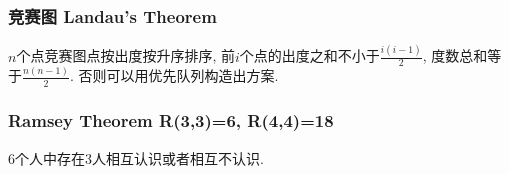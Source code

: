 \subsubsection{竞赛图 Landau's Theorem}
    $n$个点竞赛图点按出度按升序排序, 前$i$个点的出度之和不小于$\frac{i(i-1)}{2}$, 度数总和等于$\frac{n(n-1)}{2}$. 否则可以用优先队列构造出方案.

\subsubsection{Ramsey Theorem R(3,3)=6, R(4,4)=18}
    $6$个人中存在$3$人相互认识或者相互不认识.

